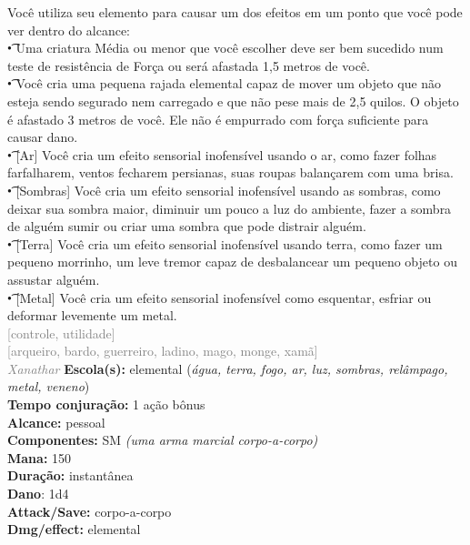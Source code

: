 \documentclass{RPG_Adventure}[2021/10/20]
\begin{document}
{\normalsize Você utiliza seu elemento para causar um dos efeitos em um ponto que você pode ver dentro do alcance:\\\t • Uma criatura Média ou menor que você escolher deve ser bem sucedido num teste de resistência de Força ou será afastada 1,5 metros de você.\\\t • Você cria uma pequena rajada elemental capaz de mover um objeto que não esteja sendo segurado nem carregado e que não pese mais de 2,5 quilos. O objeto é afastado 3 metros de você. Ele não é empurrado com força suficiente para causar dano.\\\t • [Ar] Você cria um efeito sensorial inofensível usando o ar, como fazer folhas farfalharem, ventos fecharem persianas, suas roupas balançarem com uma brisa.\\\t • [Sombras] Você cria um efeito sensorial inofensível usando as sombras, como deixar sua sombra maior, diminuir um pouco a luz do ambiente, fazer a sombra de alguém sumir ou criar uma sombra que pode distrair alguém.\\\t • [Terra] Você cria um efeito sensorial inofensível usando terra, como fazer um pequeno morrinho, um leve tremor capaz de desbalancear um pequeno objeto ou assustar alguém.\\\t • [Metal] Você cria um efeito sensorial inofensível como esquentar, esfriar ou deformar levemente um metal.\\}
{\scriptsize \textcolor{gray}{[controle, utilidade]\\}}
{\scriptsize \textcolor{gray}{[arqueiro, bardo, guerreiro, ladino, mago, monge, xamã]\\}}
{\tiny \textcolor{gray}{\textit{Xanathar}}}\jump{}
{\small \t \textbf{Escola(s):} elemental (\textit{água, terra, fogo, ar, luz, sombras, relâmpago, metal, veneno})\\\t \textbf{Tempo conjuração:} 1 ação bônus\\\t \textbf{Alcance:} pessoal\\\t \textbf{Componentes:} SM \textit{(uma arma marcial corpo-a-corpo)}\\\t \textbf{Mana:} 150\\\t \textbf{Duração:} instantânea\\\t \textbf{Dano}: 1d4\\\t \textbf{Attack/Save:} corpo-a-corpo\\\t \textbf{Dmg/effect:} elemental\\}
\end{document}
